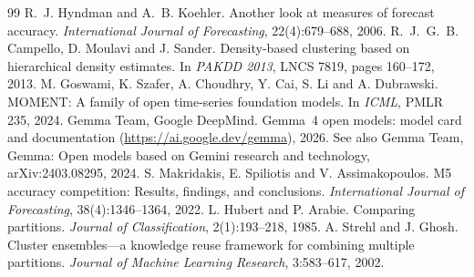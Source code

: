\documentclass[10pt,twocolumn,a4paper]{article}
\begin{document}
\begin{thebibliography}{99}\footnotesize
\setlength{\itemsep}{0pt}\setlength{\parsep}{0pt}
 R.~J. Hyndman and A.~B. Koehler. Another look at measures of forecast accuracy. \emph{International Journal of Forecasting}, 22(4):679--688, 2006.
 R.~J.~G.~B. Campello, D. Moulavi and J. Sander. Density-based clustering based on hierarchical density estimates. In \emph{PAKDD 2013}, LNCS 7819, pages 160--172, 2013.
 M. Goswami, K. Szafer, A. Choudhry, Y. Cai, S. Li and A. Dubrawski. MOMENT: A family of open time-series foundation models. In \emph{ICML}, PMLR 235, 2024.
 Gemma Team, Google DeepMind. Gemma~4 open models: model card and documentation (\url{https://ai.google.dev/gemma}), 2026. See also Gemma Team, Gemma: Open models based on Gemini research and technology, arXiv:2403.08295, 2024.
 S. Makridakis, E. Spiliotis and V. Assimakopoulos. M5 accuracy competition: Results, findings, and conclusions. \emph{International Journal of Forecasting}, 38(4):1346--1364, 2022.
 L. Hubert and P. Arabie. Comparing partitions. \emph{Journal of Classification}, 2(1):193--218, 1985.
 A. Strehl and J. Ghosh. Cluster ensembles---a knowledge reuse framework for combining multiple partitions. \emph{Journal of Machine Learning Research}, 3:583--617, 2002.
\end{thebibliography}
\end{document}
